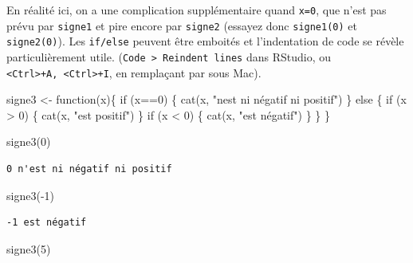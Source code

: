\documentclass[
  letterpaper,
  DIV=11,
  numbers=noendperiod]{scrreprt}
\newenvironment{Shaded}{\begin{snugshade}}{\end{snugshade}}
\newcommand{\ControlFlowTok}[1]{\textcolor[rgb]{0.00,0.23,0.31}{#1}}
\newcommand{\DecValTok}[1]{\textcolor[rgb]{0.68,0.00,0.00}{#1}}
\newcommand{\FunctionTok}[1]{\textcolor[rgb]{0.28,0.35,0.67}{#1}}
\newcommand{\NormalTok}[1]{\textcolor[rgb]{0.00,0.23,0.31}{#1}}
\newcommand{\OtherTok}[1]{\textcolor[rgb]{0.00,0.23,0.31}{#1}}
\newcommand{\SpecialCharTok}[1]{\textcolor[rgb]{0.37,0.37,0.37}{#1}}
\newcommand{\StringTok}[1]{\textcolor[rgb]{0.13,0.47,0.30}{#1}}
\begin{document}
En réalité ici, on a une complication supplémentaire quand \texttt{x=0},
que n'est pas prévu par \texttt{signe1} et pire encore par
\texttt{signe2} (essayez donc \texttt{signe1(0)} et \texttt{signe2(0)}).
Les \texttt{if/else} peuvent être emboités et l'indentation de code se
révèle particulièrement utile.
(\texttt{Code\ \textgreater{}\ Reindent\ lines} dans RStudio, ou
\texttt{\textless{}Ctrl\textgreater{}+A,\ \textless{}Ctrl\textgreater{}+I},
en remplaçant par sous Mac).

\begin{Shaded}
\begin{Highlighting}[]
\NormalTok{signe3 }\OtherTok{\textless{}{-}} \ControlFlowTok{function}\NormalTok{(x)\{}
  \ControlFlowTok{if}\NormalTok{ (x}\SpecialCharTok{==}\DecValTok{0}\NormalTok{) \{}
    \FunctionTok{cat}\NormalTok{(x, }\StringTok{"n\textquotesingle{}est ni négatif ni positif"}\NormalTok{)}
\NormalTok{  \} }\ControlFlowTok{else}\NormalTok{ \{}
    \ControlFlowTok{if}\NormalTok{ (x }\SpecialCharTok{\textgreater{}} \DecValTok{0}\NormalTok{) \{}
      \FunctionTok{cat}\NormalTok{(x, }\StringTok{"est positif"}\NormalTok{)}
\NormalTok{    \}}
    \ControlFlowTok{if}\NormalTok{ (x }\SpecialCharTok{\textless{}} \DecValTok{0}\NormalTok{) \{}
      \FunctionTok{cat}\NormalTok{(x, }\StringTok{"est négatif"}\NormalTok{)}
\NormalTok{    \}  }
\NormalTok{  \}}
\NormalTok{\}}

\FunctionTok{signe3}\NormalTok{(}\DecValTok{0}\NormalTok{)}
\end{Highlighting}
\end{Shaded}

\begin{verbatim}
0 n'est ni négatif ni positif
\end{verbatim}

\begin{Shaded}
\begin{Highlighting}[]
\FunctionTok{signe3}\NormalTok{(}\SpecialCharTok{{-}}\DecValTok{1}\NormalTok{)}
\end{Highlighting}
\end{Shaded}

\begin{verbatim}
-1 est négatif
\end{verbatim}

\begin{Shaded}
\begin{Highlighting}[]
\FunctionTok{signe3}\NormalTok{(}\DecValTok{5}\NormalTok{)}
\end{Highlighting}
\end{Shaded}
\end{document}
